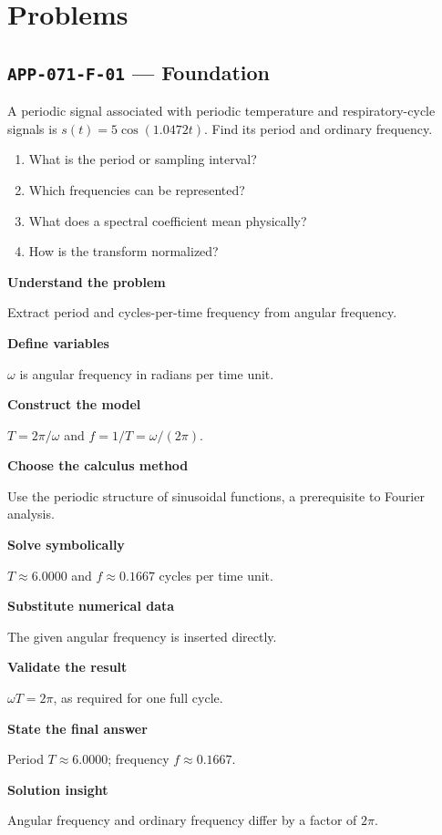 \documentclass[11pt]{book}
\newcommand{\pid}[1]{\texttt{#1}}
\begin{document}
\section*{Problems}
\subsection*{\pid{APP-071-F-01} — Foundation}
\begin{problembox}
A periodic signal associated with periodic temperature and respiratory-cycle signals is $s(t)=5\cos(1.0472t)$. Find its period and ordinary frequency.
\end{problembox}
\begin{promptbox}\begin{enumerate}
\item What is the period or sampling interval?
\item Which frequencies can be represented?
\item What does a spectral coefficient mean physically?
\item How is the transform normalized?
\end{enumerate}\end{promptbox}
\begin{solutionbox}
\textbf{Understand the problem}\par Extract period and cycles-per-time frequency from angular frequency.\par\medskip
\textbf{Define variables}\par $\omega$ is angular frequency in radians per time unit.\par\medskip
\textbf{Construct the model}\par $T=2\pi/\omega$ and $f=1/T=\omega/(2\pi)$.\par\medskip
\textbf{Choose the calculus method}\par Use the periodic structure of sinusoidal functions, a prerequisite to Fourier analysis.\par\medskip
\textbf{Solve symbolically}\par $T\approx 6.0000$ and $f\approx 0.1667$ cycles per time unit.\par\medskip
\textbf{Substitute numerical data}\par The given angular frequency is inserted directly.\par\medskip
\textbf{Validate the result}\par $\omega T=2\pi$, as required for one full cycle.\par\medskip
\textbf{State the final answer}\par Period $T\approx 6.0000$; frequency $f\approx 0.1667$.\par\medskip
\textbf{Solution insight}\par Angular frequency and ordinary frequency differ by a factor of $2\pi$.\par\medskip
\end{solutionbox}
\end{document}
